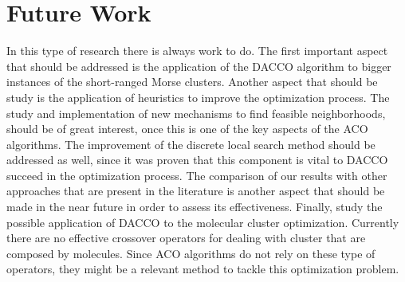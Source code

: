 \section{Future Work}

In this type of research there is always work to do. The first important aspect that should be addressed is the application of the DACCO algorithm to bigger instances of the short-ranged Morse clusters. Another aspect that should be study is the application of heuristics to improve the optimization process. The study and implementation of new mechanisms to find feasible neighborhoods, should be of great interest, once this is one of the key aspects of the ACO algorithms. The improvement of the discrete local search method should be addressed as well, since it was proven that this component is vital to DACCO succeed in the optimization process. The comparison of our results with other approaches that are present in the literature is another aspect that should be made in the near future in order to assess its effectiveness. Finally, study the possible application of DACCO to the molecular cluster optimization. Currently there are no effective crossover operators for dealing with cluster that are composed by molecules. Since ACO algorithms do not rely on these type of operators, they might be a relevant method to tackle this optimization problem.








